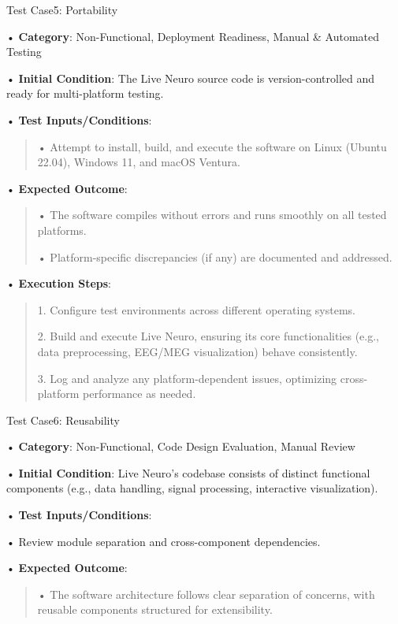 \documentclass[
]{article}
\begin{document}
Test Case5: Portability

• \textbf{Category}: Non-Functional, Deployment Readiness, Manual \&
Automated Testing

• \textbf{Initial Condition}: The Live Neuro source code is
version-controlled and ready for multi-platform testing.

• \textbf{Test Inputs/Conditions}:

\begin{quote}
• Attempt to install, build, and execute the software on Linux (Ubuntu
22.04), Windows 11, and macOS Ventura.
\end{quote}

• \textbf{Expected Outcome}:

\begin{quote}
• The software compiles without errors and runs smoothly on all tested
platforms.

• Platform-specific discrepancies (if any) are documented and addressed.
\end{quote}

• \textbf{Execution Steps}:

\begin{quote}
1. Configure test environments across different operating systems.

2. Build and execute Live Neuro, ensuring its core functionalities
(e.g., data preprocessing, EEG/MEG visualization) behave consistently.

3. Log and analyze any platform-dependent issues, optimizing
cross-platform performance as needed.
\end{quote}

Test Case6: Reusability

• \textbf{Category}: Non-Functional, Code Design Evaluation, Manual
Review

• \textbf{Initial Condition}: Live Neuro's codebase consists of distinct
functional components (e.g., data handling, signal processing,
interactive visualization).

• \textbf{Test Inputs/Conditions}:

• Review module separation and cross-component dependencies.

• \textbf{Expected Outcome}:

\begin{quote}
• The software architecture follows clear separation of concerns, with
reusable components structured for extensibility.
\end{quote}
\end{document}
